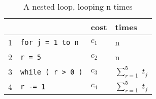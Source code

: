 \begin{center}
	\begin{table}[h]
		\centering
		\begin{tabular}{|l|l|l|l|}
			 \hline
			  &  								& cost  & times 				\\ \hline
			1 & \lstinline|for j = 1 to n| 		& $c_1$ & n 					\\ 
			2 & \lstinline|r = 5|				& $c_2$ & n 					\\ 
			3 & \lstinline|while ( r > 0 )|		& $c_3$ & $\sum_{r=1}^{5}\;t_j$ \\ 
			4 & \lstinline|r -= 1| 				& $c_4$ & $\sum_{r=1}^{5}\;t_j$ \\ \hline
		\end{tabular}
		\caption{A nested loop, looping n times}
		\label{tab:simpleCode}
	\end{table}
\end{center}